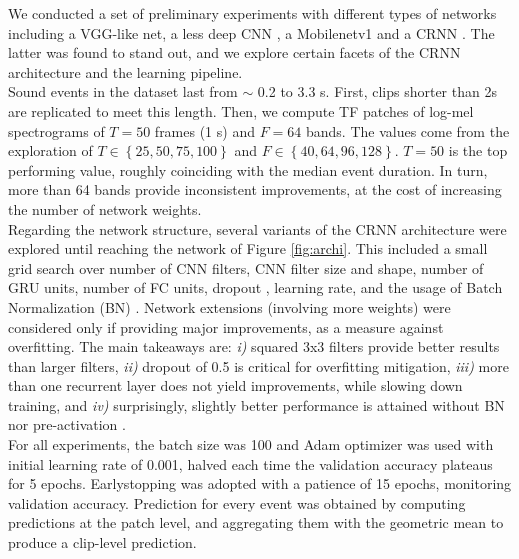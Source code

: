 We conducted a set of preliminary experiments with different types of networks including a VGG-like net, a less deep CNN \cite{Fonseca2019learning}, a Mobilenetv1 \cite{howard2017mobilenets} and a CRNN \cite{cakir2017convolutional}.
The latter was found to stand out, and we explore certain facets of the CRNN architecture and the learning pipeline.\\

Sound events in the dataset last from $\sim$ 0.2 to 3.3 s.
First, clips shorter than 2s are replicated to meet this length.
Then, we compute TF patches of log-mel spectrograms of $T=50$ frames (1 s) and $F=64$ bands.
The values come from the exploration of $T \in \left\lbrace 25,50,75,100\right\rbrace$ and $F \in \left\lbrace 40,64,96,128\right\rbrace$.
$T=50$ is the top performing value, roughly coinciding with the median event duration. In turn, more than 64 bands provide inconsistent improvements, at the cost of increasing the number of network weights.\\

Regarding the network structure, several variants of the CRNN architecture were explored until reaching the network of Figure \ref{fig:archi}.
This included a small grid search over number of CNN filters, CNN filter size and shape, number of GRU units, number of FC units, dropout \cite{srivastava2014dropout}, learning rate, and the usage of Batch Normalization (BN) \cite{ioffe2015batch}.
Network extensions (involving more weights) were considered only if providing major improvements, as a measure against overfitting.
The main takeaways are: \textit{i)} squared 3x3 filters provide better results than larger filters, \textit{ii)} dropout of 0.5 is critical for overfitting mitigation, \textit{iii)} more than one recurrent layer does not yield improvements, while slowing down training, and \textit{iv)} surprisingly, slightly better performance is attained without BN nor pre-activation \cite{fonseca2018simple}. \\

For all experiments, the batch size was 100 and Adam optimizer was used \cite{kingma2014adam} with initial learning rate of 0.001, halved each time the validation accuracy plateaus for 5 epochs.
Earlystopping was adopted with a patience of 15 epochs, monitoring validation accuracy.
Prediction for every event was obtained by computing predictions at the patch level, and aggregating them with the geometric mean to produce a clip-level prediction. \\


